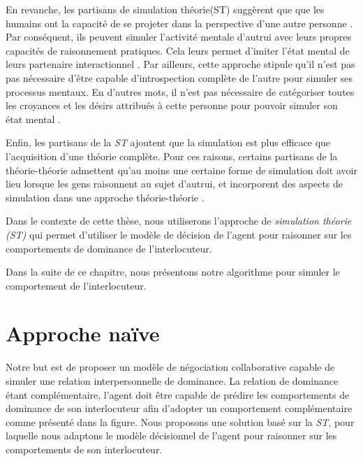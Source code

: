 En revanche, les partisans de simulation théorie(ST)  suggèrent que  que les humains ont la capacité de se projeter dans la perspective d'une autre personne \cite{shanton2010simulation}.
Par conséquent, ils peuvent simuler l'activité mentale d'autrui avec leurs propres capacités de raisonnement pratiques. Cela leurs permet d'imiter l'état mental de leurs partenaire interactionnel \cite{harbers2009modeling}.
Par ailleurs, cette approche stipule qu'il n'est pas pas nécessaire d'être capable d'introspection complète de l'autre pour simuler ses processus mentaux. En d'autres mots, il n'est pas nécessaire de catégoriser toutes les croyances et les désirs attribués à cette personne pour pouvoir simuler son état mental \cite{harbers2012modeling}.

Enfin, les partisans de la \emph{ST} ajoutent que la simulation est plus efficace que l'acquisition d'une théorie complète. Pour ces raisons, certains partisans de la théorie-théorie admettent qu'au moins une certaine forme de simulation doit avoir lieu lorsque les gens raisonnent au sujet d'autrui, et incorporent des aspects de simulation dans une approche théorie-théorie \cite{harbers2012modeling}.

Dans le contexte de cette thèse, nous utiliserons l'approche de \emph{simulation théorie (ST)} qui permet d'utiliser le modèle de décision de l'agent pour raisonner sur les comportements de dominance de l'interlocuteur. 

Dans la suite de ce chapitre, nous présentons notre algorithme pour simuler le comportement de l'interlocuteur.


\section{Approche naïve}
	Notre but est de proposer un modèle de négociation collaborative capable de simuler une relation interpersonnelle de dominance. La relation de dominance étant complémentaire, l'agent doit être capable de prédire les comportements de dominance de son interlocuteur afin d'adopter un comportement complémentaire comme présenté dans la figure. Nous proposons une solution basé sur la \emph{ST}, pour laquelle nous adaptons le modèle décisionnel de l'agent pour raisonner sur les comportements de son interlocuteur. 
	
